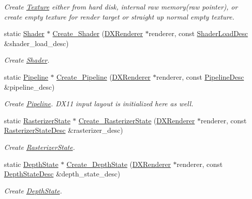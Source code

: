 \begin{DoxyCompactItemize}
\begin{DoxyCompactList}\small\item\em Create \hyperlink{classTexture}{Texture} either from hard disk, internal raw memory(raw pointer), or create empty texture for render target or straight up normal empty texture. \end{DoxyCompactList}\item 
static \hyperlink{classShader}{Shader} $\ast$ \hyperlink{classDXResourceLoader_afc2a341f6271142b090fe1b51502882c}{Create\+\_\+\+Shader} (\hyperlink{classDXRenderer}{D\+X\+Renderer} $\ast$renderer, const \hyperlink{structShaderLoadDesc}{Shader\+Load\+Desc} \&shader\+\_\+load\+\_\+desc)
\begin{DoxyCompactList}\small\item\em Create \hyperlink{classShader}{Shader}. \end{DoxyCompactList}\item 
static \hyperlink{classPipeline}{Pipeline} $\ast$ \hyperlink{classDXResourceLoader_a72a314827079951bfe5dd41fbab56229}{Create\+\_\+\+Pipeline} (\hyperlink{classDXRenderer}{D\+X\+Renderer} $\ast$renderer, const \hyperlink{structPipelineDesc}{Pipeline\+Desc} \&pipeline\+\_\+desc)
\begin{DoxyCompactList}\small\item\em Create \hyperlink{classPipeline}{Pipeline}. D\+X11 input layout is initialized here as well. \end{DoxyCompactList}\item 
static \hyperlink{classRasterizerState}{Rasterizer\+State} $\ast$ \hyperlink{classDXResourceLoader_a3c7d160030a87f4973a9c2ec1893188f}{Create\+\_\+\+Rasterizer\+State} (\hyperlink{classDXRenderer}{D\+X\+Renderer} $\ast$renderer, const \hyperlink{structRasterizerStateDesc}{Rasterizer\+State\+Desc} \&rasterizer\+\_\+desc)
\begin{DoxyCompactList}\small\item\em Create \hyperlink{classRasterizerState}{Rasterizer\+State}. \end{DoxyCompactList}\item 
static \hyperlink{classDepthState}{Depth\+State} $\ast$ \hyperlink{classDXResourceLoader_a470927b59b264d5ca7fc22b63d20801e}{Create\+\_\+\+Depth\+State} (\hyperlink{classDXRenderer}{D\+X\+Renderer} $\ast$renderer, const \hyperlink{structDepthStateDesc}{Depth\+State\+Desc} \&depth\+\_\+state\+\_\+desc)
\begin{DoxyCompactList}\small\item\em Create \hyperlink{classDepthState}{Depth\+State}. \end{DoxyCompactList}\item 

\end{DoxyCompactItemize}
